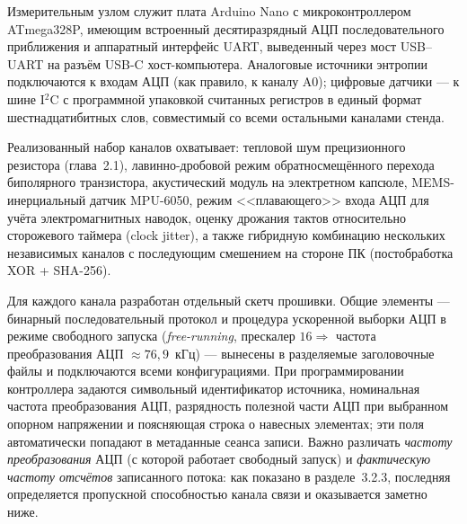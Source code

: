 
Измерительным узлом служит плата Arduino Nano с микроконтроллером ATmega328P,
имеющим встроенный десятиразрядный АЦП последовательного приближения и аппаратный
интерфейс UART, выведенный через мост USB--UART на разъём USB-C хост-компьютера.
Аналоговые источники энтропии подключаются к входам АЦП (как правило, к каналу A0);
цифровые датчики --- к шине I$^2$C с программной упаковкой считанных регистров в
единый формат шестнадцатибитных слов, совместимый со всеми остальными каналами стенда.

Реализованный набор каналов охватывает: тепловой шум прецизионного резистора
(глава~2.1), лавинно-дробовой режим обратносмещённого перехода биполярного транзистора,
акустический модуль на электретном капсюле, MEMS-инерциальный датчик MPU-6050,
режим <<плавающего>> входа АЦП для учёта электромагнитных наводок, оценку дрожания
тактов относительно сторожевого таймера (clock jitter), а также гибридную комбинацию
нескольких независимых каналов с последующим смешением на стороне ПК (постобработка
XOR + SHA-256).

Для каждого канала разработан отдельный скетч прошивки. Общие элементы --- бинарный
последовательный протокол и процедура ускоренной выборки АЦП в режиме свободного
запуска (\textit{free-running}, прескалер $16 \Rightarrow$ частота преобразования АЦП
$\approx 76{,}9$~кГц) --- вынесены в разделяемые заголовочные файлы и подключаются
всеми конфигурациями. При программировании контроллера задаются символьный
идентификатор источника, номинальная частота преобразования АЦП, разрядность полезной
части АЦП при выбранном опорном напряжении и поясняющая строка о навесных элементах;
эти поля автоматически попадают в метаданные сеанса записи. Важно различать
\emph{частоту преобразования} АЦП (с которой работает свободный запуск) и
\emph{фактическую частоту отсчётов} записанного потока: как показано в разделе~3.2.3,
последняя определяется пропускной способностью канала связи и оказывается заметно
ниже.

